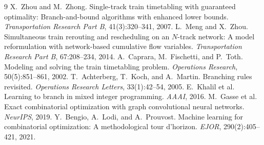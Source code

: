 \documentclass[11pt]{article}
\begin{document}
\begin{thebibliography}{9}
 X.~Zhou and M.~Zhong. Single-track train timetabling with guaranteed
optimality: Branch-and-bound algorithms with enhanced lower bounds. \emph{Transportation
Research Part B}, 41(3):320--341, 2007.
 L.~Meng and X.~Zhou. Simultaneous train rerouting and rescheduling on an
$N$-track network: A model reformulation with network-based cumulative flow variables.
\emph{Transportation Research Part B}, 67:208--234, 2014.
 A.~Caprara, M.~Fischetti, and P.~Toth. Modeling and solving the train
timetabling problem. \emph{Operations Research}, 50(5):851--861, 2002.
 T.~Achterberg, T.~Koch, and A.~Martin. Branching rules revisited.
\emph{Operations Research Letters}, 33(1):42--54, 2005.
 E.~Khalil et al. Learning to branch in mixed integer programming.
\emph{AAAI}, 2016.
 M.~Gasse et al. Exact combinatorial optimization with graph convolutional
neural networks. \emph{NeurIPS}, 2019.
 Y.~Bengio, A.~Lodi, and A.~Prouvost. Machine learning for combinatorial
optimization: A methodological tour d'horizon. \emph{EJOR}, 290(2):405--421, 2021.
\end{thebibliography}
\end{document}
